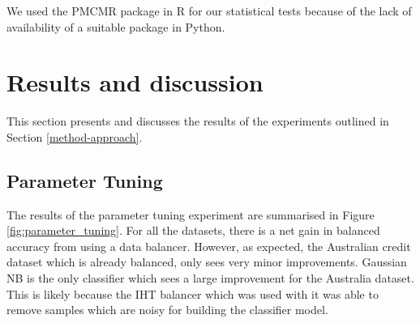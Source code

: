 \documentclass{sig-alternate-05-2015}
\begin{document}
	We used the PMCMR \cite{pmcmr} package in R for our statistical tests because of the lack of availability of a suitable package in Python.
	
	\section{Results and discussion}
	\label{results}
	This section presents and discusses the results of the experiments outlined in Section \ref{method-approach}.
	\subsection{Parameter Tuning}
	\label{sec:parameter_tuning}
	The results of the parameter tuning experiment are summarised in Figure \ref{fig:parameter_tuning}. For all the datasets, there is a net gain in balanced accuracy from using a data balancer. However, as expected, the Australian credit dataset which is already balanced, only sees very minor improvements. Gaussian NB is the only classifier which sees a large improvement for the Australia dataset. This is likely because the IHT balancer which was used with it was able to remove samples which are noisy for building the classifier model. 
	
\end{document}
